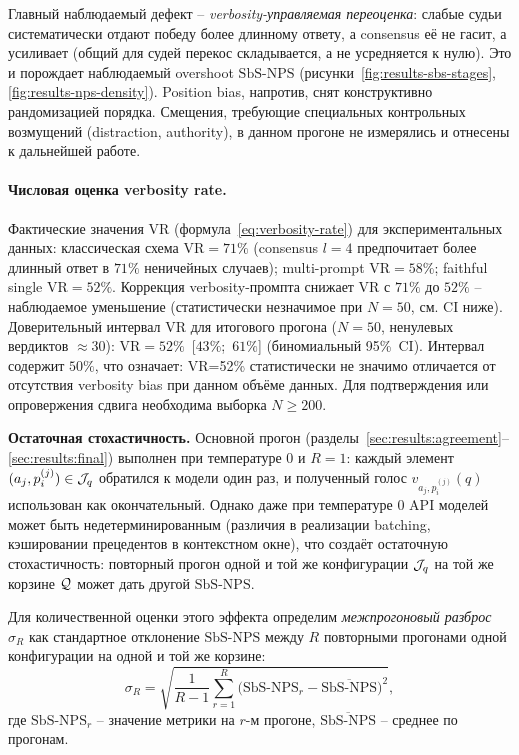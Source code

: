 Главный наблюдаемый дефект -- \emph{verbosity-управляемая переоценка}:
слабые судьи систематически отдают победу более длинному ответу, а
consensus её не гасит, а усиливает (общий для судей перекос складывается,
а не усредняется к нулю). Это и порождает наблюдаемый overshoot
$\mathrm{SbS\text{-}NPS}$ (рисунки~\ref{fig:results-sbs-stages},
\ref{fig:results-nps-density}). Position bias, напротив, снят
конструктивно рандомизацией порядка. Смещения, требующие специальных
контрольных возмущений (distraction, authority), в данном прогоне не
измерялись и отнесены к дальнейшей работе.

\paragraph{Числовая оценка verbosity rate.}
Фактические значения VR (формула~\eqref{eq:verbosity-rate}) для экспериментальных данных: классическая схема $\mathrm{VR} = 71\%$ (consensus $l=4$ предпочитает более длинный ответ в $71\%$ неничейных случаев); multi-prompt $\mathrm{VR} = 58\%$; faithful single $\mathrm{VR} = 52\%$. Коррекция verbosity-промпта снижает VR с $71\%$ до $52\%$ -- наблюдаемое уменьшение (статистически незначимое при $N = 50$, см. CI ниже). Доверительный интервал VR для итогового прогона ($N = 50$, ненулевых вердиктов $\approx 30$): $\mathrm{VR} = 52\%$~[$43\%$;~$61\%$] (биномиальный 95\%~CI). Интервал содержит $50\%$, что означает: VR=52\% статистически не значимо отличается от отсутствия verbosity bias при данном объёме данных. Для подтверждения или опровержения сдвига необходима выборка $N \ge 200$.

\textbf{Остаточная стохастичность.}
Основной прогон (разделы~\ref{sec:results:agreement}--
\ref{sec:results:final}) выполнен при температуре $0$ и $R = 1$:
каждый элемент $(a_j, p_i^{(j)}) \in \mathcal{J}_q$ обратился к
модели один раз, и полученный голос $v_{a_j, p_i^{(j)}}(q)$
использован как окончательный.
Однако даже при температуре $0$ API моделей может быть
недетерминированным (различия в реализации batching, кэшировании
прецедентов в контекстном окне), что создаёт остаточную
стохастичность: повторный прогон одной и той же конфигурации
$\mathcal{J}_q$ на той же корзине $\mathcal{Q}$ может дать другой
$\mathrm{SbS\text{-}NPS}$.

Для количественной оценки этого эффекта определим \emph{межпрогоновый
разброс} $\sigma_R$ как стандартное отклонение $\mathrm{SbS\text{-}NPS}$
между $R$ повторными прогонами одной конфигурации на одной и той же
корзине:
\begin{equation}
    \label{eq:inter-run-std}
    \sigma_R = \sqrt{
        \frac{1}{R - 1}\sum_{r=1}^{R}
            \bigl(\mathrm{SbS\text{-}NPS}_r - \overline{\mathrm{SbS\text{-}NPS}}\bigr)^2
    },
\end{equation}
где $\mathrm{SbS\text{-}NPS}_r$ -- значение метрики на $r$-м прогоне,
$\overline{\mathrm{SbS\text{-}NPS}}$ -- среднее по прогонам.

